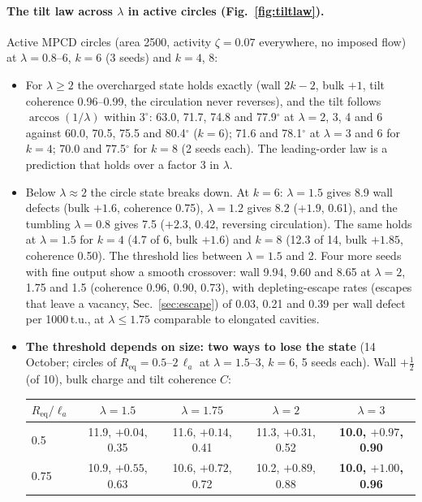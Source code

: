 \documentclass[11pt,a4paper]{article}
\newcommand{\half}{\tfrac12}
\newcommand{\la}{\ell_a}
\begin{document}
\paragraph{The tilt law across $\lambda$ in active circles (Fig.~\ref{fig:tiltlaw}).} Active MPCD circles (area 2500, activity $\zeta=0.07$ everywhere, no imposed flow) at $\lambda=0.8$--6, $k=6$ (3 seeds) and $k=4$, 8:
\begin{itemize}
  \item For $\lambda\ge2$ the overcharged state holds exactly (wall $2k-2$, bulk $+1$, tilt coherence 0.96--0.99, the circulation never reverses), and the tilt follows $\arccos(1/\lambda)$ within
        $3^\circ$: 63.0, 71.7, 74.8 and 77.9$^\circ$ at $\lambda=2$, 3, 4 and 6 against 60.0, 70.5, 75.5 and 80.4$^\circ$ ($k=6$); 71.6 and 78.1$^\circ$ at $\lambda=3$ and 6 for $k=4$; 70.0 and 77.5$^\circ$ for $k=8$ (2 seeds each).
        The leading-order law is a prediction that holds over a factor 3 in $\lambda$.
  \item Below $\lambda\approx2$ the circle state breaks down. At $k=6$: $\lambda=1.5$ gives 8.9 wall defects (bulk $+1.6$, coherence 0.75), $\lambda=1.2$ gives 8.2 ($+1.9$, 0.61), and the tumbling
        $\lambda=0.8$ gives 7.5 ($+2.3$, 0.42, reversing circulation). The same holds at $\lambda=1.5$ for $k=4$ (4.7 of 6, bulk $+1.6$) and $k=8$ (12.3 of 14, bulk $+1.85$, coherence 0.50). The threshold lies between $\lambda=1.5$ and 2. Four more seeds with fine output show a smooth crossover: wall 9.94, 9.60 and 8.65 at $\lambda=2$, 1.75 and 1.5 (coherence 0.96, 0.90, 0.73),
        with depleting-escape rates (escapes that leave a vacancy, Sec.~\ref{sec:escape}) of 0.03, 0.21 and 0.39 per wall defect per 1000\,t.u., at $\lambda\le1.75$ comparable to elongated cavities.
  \item \textbf{The threshold depends on size: two ways to lose the state} (14 October; circles of $R_\mathrm{eq}=0.5$--$2\,\la$ at $\lambda=1.5$--3, $k=6$, 5 seeds each).
        Wall $+\half$ (of 10), bulk charge and tilt coherence $C$:
        \begin{center}\small\begin{tabular}{lcccc}\toprule
        $R_\mathrm{eq}/\la$ & $\lambda=1.5$ & $\lambda=1.75$ & $\lambda=2$ & $\lambda=3$\\\midrule
        0.5 & 11.9, $+0.04$, 0.35 & 11.6, $+0.14$, 0.41 & 11.3, $+0.31$, 0.52 & \textbf{10.0, $+0.97$, 0.90}\\
        0.75 & 10.9, $+0.55$, 0.63 & 10.6, $+0.72$, 0.72 & 10.2, $+0.89$, 0.88 & \textbf{10.0, $+1.00$, 0.96}\\

\end{tabular}
\end{center}
\end{itemize}
\end{document}

